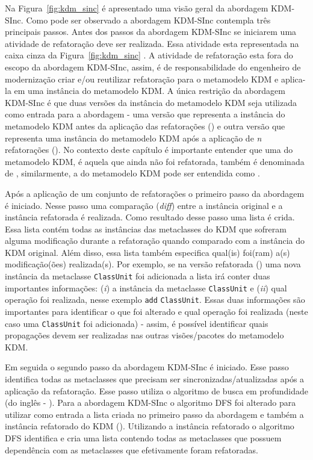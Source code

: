 Na Figura~\ref{fig:kdm_sinc} é apresentado uma visão geral da abordagem KDM-SInc. Como pode ser observado a abordagem KDM-SInc contempla três principais passos. Antes dos passos da abordagem KDM-SInc se iniciarem uma atividade de refatoração deve ser realizada. Essa atividade esta representada na caixa cinza da Figura~\ref{fig:kdm_sinc} . A atividade de refatoração esta fora do escopo da abordagem KDM-SInc, assim, é de responsabilidade do engenheiro de modernização criar e/ou reutilizar refatoração para o metamodelo KDM e aplica-la em uma instância do metamodelo KDM. A única restrição da abordagem KDM-SInc é que duas versões da instância do metamodelo KDM seja utilizada como entrada para a abordagem - uma versão que representa a instância do metamodelo KDM antes da aplicação das refatorações () e outra versão que representa uma instância do metamodelo KDM após a aplicação de \textit{n} refatorações (). No contexto deste capítulo é importante entender que uma  do metamodelo KDM, é aquela que ainda não foi refatorada, também é denominada de , similarmente, a  do metamodelo KDM pode ser entendida como . 


Após a aplicação de um conjunto de refatorações o primeiro passo da abordagem é iniciado. Nesse passo uma comparação (\textit{diff}) entre a instância original e a instância refatorada é realizada. Como resultado desse passo uma lista é crida. Essa lista contém todas as instâncias das metaclasses do KDM que sofreram alguma modificação durante a refatoração quando comparado com a instância do KDM original. Além disso, essa lista também especifica qual(is) foi(ram) a(s) modificação(ões) realizada(s). Por exemplo, se na versão refatorada () uma nova instância da metaclasse \texttt{ClassUnit} foi adicionada a lista irá conter duas importantes informações: (\textit{i}) a instância da metaclasse \texttt{ClassUnit} e (\textit{ii}) qual operação foi realizada, nesse exemplo \texttt{add} \texttt{ClassUnit}. Essas duas informações são importantes para identificar o que foi alterado e qual operação foi realizada (neste caso uma \texttt{ClassUnit} foi adicionada) - assim, é possível identificar quais propagações devem ser realizadas nas outras visões/pacotes do metamodelo KDM.

Em seguida o segundo passo da abordagem KDM-SInc é iniciado. Esse passo identifica todas as metaclasses que precisam ser sincronizadas/atualizadas após a aplicação da refatoração. Esse passo utiliza o algoritmo de busca em profundidade (do inglês - ). Para a abordagem KDM-SInc o algoritmo DFS foi alterado para utilizar como entrada a lista criada no primeiro passo da abordagem e também a instância refatorado do KDM (). Utilizando a instância refatorado o algoritmo DFS identifica e cria uma lista contendo todas as metaclasses que possuem dependência com as metaclasses que efetivamente foram refatoradas.

